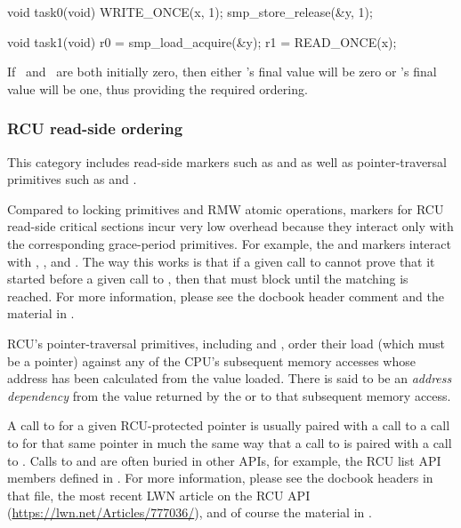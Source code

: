 \begin{VerbatimU}
	void task0(void)
	{
		WRITE_ONCE(x, 1);
		smp_store_release(&y, 1);
	}

	void task1(void)
	{
		r0 = smp_load_acquire(&y);
		r1 = READ_ONCE(x);
	}
\end{VerbatimU}

If~ and~ are both initially zero, then either 's final
value will be zero or 's final value will be one, thus providing
the required ordering.


\subsubsection{RCU read-side ordering}

This category includes read-side markers such as 
and  as well as pointer-traversal primitives such as
 and .

Compared to locking primitives and RMW atomic operations, markers
for RCU read-side critical sections incur very low overhead because
they interact only with the corresponding grace-period primitives.
For example, the  and  markers interact
with , , and .
The way this works is that if a given call to  cannot
prove that it started before a given call to , then
that  must block until the matching 
is reached.
For more information, please see the 
docbook header comment and the material in .

RCU's pointer-traversal primitives, including  and
, order their load (which must be a pointer) against any
of the CPU's subsequent memory accesses whose address has been calculated
from the value loaded.
There is said to be an \emph{address dependency} from the value returned by
the  or  to that subsequent
memory access.

A call to  for a given RCU-protected pointer is
usually paired with a call to a call to  for that
same pointer in much the same way that a call to  is
paired with a call to .
Calls to  and  are often
buried in other APIs, for example, the RCU list API members defined in
.
For more information, please see the docbook headers in that file, the most
recent LWN article on the RCU API (\url{https://lwn.net/Articles/777036/}),
and of course the material in .

